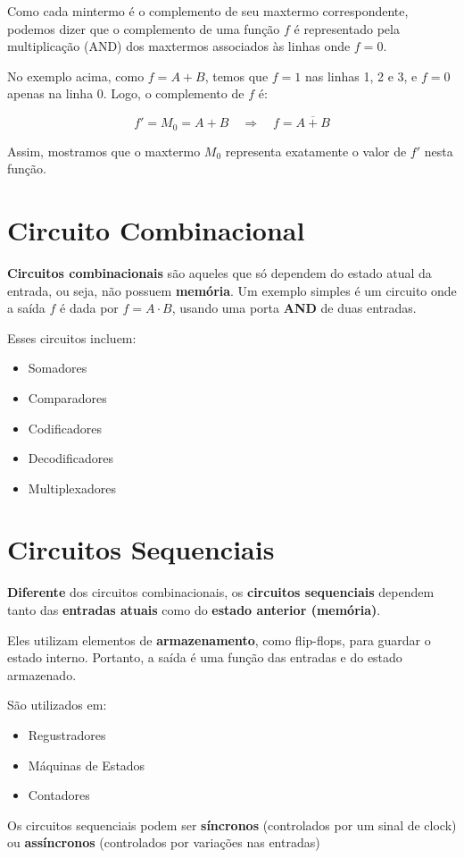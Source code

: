 \documentclass[12pt]{article}
\begin{document}
\begin{tcolorbox}[mynote, title=Mintermos, Maxtermos e Complemento]
Como cada mintermo é o complemento de seu maxtermo correspondente, podemos dizer que o complemento de uma função $f$ é representado pela multiplicação (AND) dos maxtermos associados às linhas onde $f = 0$.

No exemplo acima, como $f = A + B$, temos que $f = 1$ nas linhas 1, 2 e 3, e $f = 0$ apenas na linha 0. Logo, o complemento de $f$ é:

\[
f' = M_0 = A + B
\quad \Rightarrow \quad f = \overline{A + B}
\]

Assim, mostramos que o maxtermo $M_0$ representa exatamente o valor de $f'$ nesta função.
\end{tcolorbox}

\section{Circuito Combinacional}

\textbf{Circuitos combinacionais} são aqueles que só dependem do estado atual da entrada, ou seja, não possuem \textbf{memória}.
Um exemplo simples é um circuito onde a saída $f$ é dada por $f = A \cdot B$, usando uma porta \textbf{AND} de duas entradas.

\vspace{0.5cm}

Esses circuitos incluem:

\begin{itemize}
   \item Somadores
   \item Comparadores
   \item Codificadores
   \item Decodificadores
   \item Multiplexadores
\end{itemize}

\section{Circuitos Sequenciais}

\textbf{Diferente} dos circuitos combinacionais, os \textbf{circuitos sequenciais} dependem tanto das \textbf{entradas atuais} como do \textbf{estado anterior (memória)}.

Eles utilizam elementos de \textbf{armazenamento}, como flip-flops, para guardar o estado interno. Portanto, a saída é uma função das entradas e do estado armazenado. 

\vspace{0.5cm}

São utilizados em:

\begin{itemize}
   \item Regustradores
   \item Máquinas de Estados
   \item Contadores
\end{itemize}

\vspace{0.5cm}

Os circuitos sequenciais podem ser \textbf{síncronos} (controlados por um sinal de clock) ou \textbf{assíncronos} (controlados por variações nas entradas)
\end{document}
